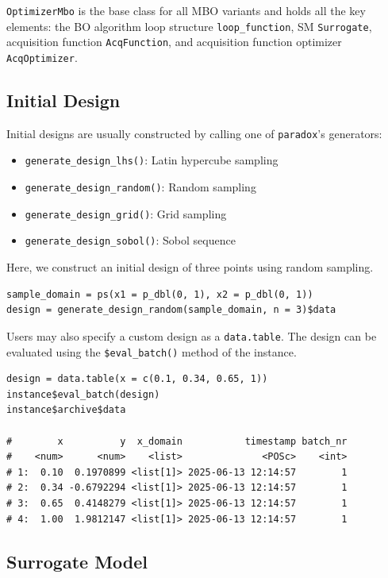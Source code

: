\documentclass[12pt,letterpaper]{article}
\begin{document}
\texttt{OptimizerMbo} is the base class for all MBO variants and holds all the key elements: the BO algorithm loop structure \texttt{loop\_function}, SM \texttt{Surrogate},  acquisition function \texttt{AcqFunction}, and acquisition function optimizer \texttt{AcqOptimizer}.

\subsection*{Initial Design}

Initial designs are usually constructed by calling one of \texttt{paradox}'s generators:

\begin{itemize}
  \item \texttt{generate\_design\_lhs()}: Latin hypercube sampling
  \item \texttt{generate\_design\_random()}: Random sampling
  \item \texttt{generate\_design\_grid()}: Grid sampling
  \item \texttt{generate\_design\_sobol()}: Sobol sequence
\end{itemize}

Here, we construct an initial design of three points using random sampling.

\begin{verbatim}
sample_domain = ps(x1 = p_dbl(0, 1), x2 = p_dbl(0, 1))
design = generate_design_random(sample_domain, n = 3)$data
\end{verbatim}

Users may also specify a custom design as a \texttt{data.table}. 
The design can be evaluated using the \texttt{\$eval\_batch()} method of the instance.

\begin{verbatim}
design = data.table(x = c(0.1, 0.34, 0.65, 1))
instance$eval_batch(design)
instance$archive$data

#        x          y  x_domain           timestamp batch_nr
#    <num>      <num>    <list>              <POSc>    <int>
# 1:  0.10  0.1970899 <list[1]> 2025-06-13 12:14:57        1
# 2:  0.34 -0.6792294 <list[1]> 2025-06-13 12:14:57        1
# 3:  0.65  0.4148279 <list[1]> 2025-06-13 12:14:57        1
# 4:  1.00  1.9812147 <list[1]> 2025-06-13 12:14:57        1
\end{verbatim}

\subsection*{Surrogate Model}
\end{document}
